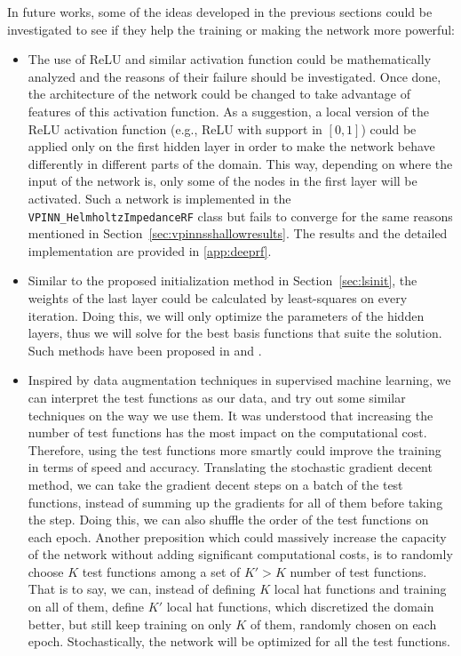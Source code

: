 In future works, some of the ideas developed in the previous sections could be investigated to see if they help the training or making the network more powerful:
\begin{itemize}
    \item The use of ReLU and similar activation function could be mathematically analyzed and the reasons of their failure should be investigated. Once done, the architecture of the network could be changed to take advantage of features of this activation function. As a suggestion, a local version of the ReLU activation function (e.g., ReLU with support in $[0, 1]$) could be applied only on the first hidden layer in order to make the network behave differently in different parts of the domain. This way, depending on where the input of the network is, only some of the nodes in the first layer will be activated. Such a network is implemented in the \texttt{VPINN\_HelmholtzImpedanceRF} class but fails to converge for the same reasons mentioned in Section~\ref{sec:vpinnsshallowresults}. The results and the detailed implementation are provided in \autoref{app:deeprf}.

    \item Similar to the proposed initialization method in Section~\ref{sec:lsinit}, the weights of the last layer could be calculated by least-squares on every iteration. Doing this, we will only optimize the parameters of the hidden layers, thus we will solve for the best basis functions that suite the solution. Such methods have been proposed in \cite{cyr2019} and \cite{liu2021}.

    \item Inspired by data augmentation techniques in supervised machine learning, we can interpret the test functions as our data, and try out some similar techniques on the way we use them. It was understood that increasing the number of test functions has the most impact on the computational cost. Therefore, using the test functions more smartly could improve the training in terms of speed and accuracy. Translating the stochastic gradient decent method, we can take the gradient decent steps on a batch of the test functions, instead of summing up the gradients for all of them before taking the step. Doing this, we can also shuffle the order of the test functions on each epoch. Another preposition which could massively increase the capacity of the network without adding significant computational costs, is to randomly choose $K$ test functions among a set of $K'>K$ number of test functions. That is to say, we can, instead of defining $K$ local hat functions and training on all of them, define $K'$ local hat functions, which discretized the domain better, but still keep training on only $K$ of them, randomly chosen on each epoch. Stochastically, the network will be optimized for all the test functions.


\end{itemize}
